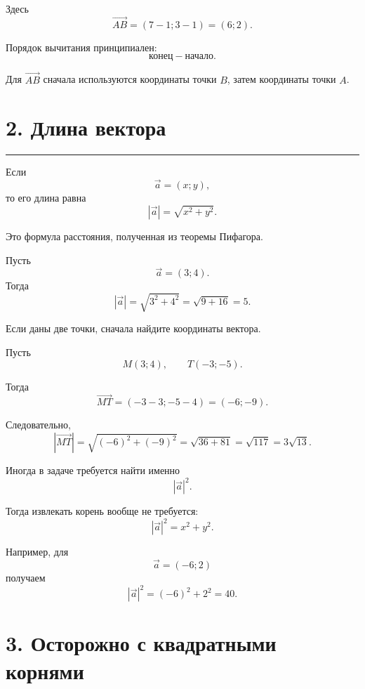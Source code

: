 \documentclass[a4paper,12pt]{article}
\newcommand{\vect}[1]{\overrightarrow{#1}}
\newcommand{\sectionline}{%
    \par\noindent
    {\color{accent}\rule{\linewidth}{0.6pt}}
    \par
}
\begin{document}
Здесь
\[
\vect{AB}=(7-1;3-1)=(6;2).
\]

\begin{warningbox}
Порядок вычитания принципиален:
\[
\boxed{\text{конец} - \text{начало}.}
\]

Для \(\vect{AB}\) сначала используются координаты точки \(B\),
затем координаты точки \(A\).
\end{warningbox}


\section*{\color{darkaccent}2. Длина вектора}

\sectionline

Если
\[
\vec a=(x;y),
\]
то его длина равна
\[
\boxed{
|\vec a|=\sqrt{x^2+y^2}.
}
\]

Это формула расстояния, полученная из теоремы Пифагора.

\begin{examplebox}[Пример]
Пусть
\[
\vec a=(3;4).
\]
Тогда
\[
|\vec a|
=
\sqrt{3^2+4^2}
=
\sqrt{9+16}
=
5.
\]
\end{examplebox}

Если даны две точки, сначала найдите координаты вектора.

\begin{examplebox}
Пусть
\[
M(3;4),\qquad T(-3;-5).
\]

Тогда
\[
\vect{MT}
=
(-3-3;-5-4)
=
(-6;-9).
\]

Следовательно,
\[
|\vect{MT}|
=
\sqrt{(-6)^2+(-9)^2}
=
\sqrt{36+81}
=
\sqrt{117}
=
3\sqrt{13}.
\]
\end{examplebox}

\begin{keybox}
Иногда в задаче требуется найти именно
\[
|\vec a|^2.
\]

Тогда извлекать корень вообще не требуется:
\[
\boxed{
|\vec a|^2=x^2+y^2.
}
\]

Например, для
\[
\vec a=(-6;2)
\]
получаем
\[
|\vec a|^2=(-6)^2+2^2=40.
\]
\end{keybox}


\section*{\color{darkaccent}3. Осторожно с квадратными корнями}
\end{document}

